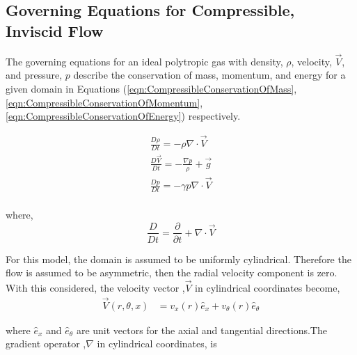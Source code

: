 

\subsection{Governing Equations for Compressible, Inviscid Flow}

The governing equations for an ideal polytropic gas with density, $\rho$, velocity, $\vec{V}$, and 
pressure, $p$ describe the conservation of mass, momentum, and energy for a 
given domain in Equations (\ref{eqn:CompressibleConservationOfMass},
\ref{eqn:CompressibleConservationOfMomentum},
\ref{eqn:CompressibleConservationOfEnergy}) respectively. 

\begin{align}
    \frac{D\rho}{Dt} = - \rho \nabla \cdot \vec{V} 
    \label{eqn:CompressibleConservationOfMass} \\
    \frac{D\vec{V}}{Dt} = - \frac{\nabla p}{\rho} + \vec{g} 
    \label{eqn:CompressibleConservationOfMomentum} \\
    \frac{Dp}{Dt} = - \gamma p \nabla \cdot \vec{V} 
    \label{eqn:CompressibleConservationOfEnergy} \\
\end{align}

where,
\begin{equation}
    \frac{D}{Dt} = \frac{\partial }{\partial t} + \nabla \cdot \vec{V}
    \label{eqn:MaterialDerivative}
\end{equation}

For this model, the domain is assumed to be uniformly cylindrical. Therefore the
flow is assumed to be asymmetric, then the radial velocity component is 
zero. With this considered, the velocity vector ,$\vec{V}$ in 
cylindrical coordinates become,
\begin{align}
    \vec{V}(r,\theta,x) &= v_x(r) \hat{e}_x + v_{\theta} (r) \hat{e}_{\theta} 
    \label{eqn:VelocityVector}
\end{align}
  
where $\hat{e}_x$ and $\hat{e}_{\theta}$ are unit vectors for the axial and 
tangential directions.The gradient operator ,$\nabla$ in cylindrical
coordinates, is 


